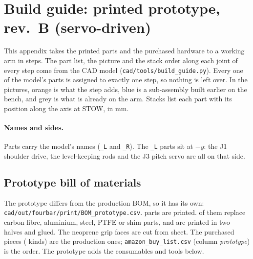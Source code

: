 \documentclass[10pt]{article}
\begin{document}
\clearpage
\appendix
\section{Build guide: printed prototype, rev.~B (servo-driven)}\label{sec:build}
This appendix takes the printed parts and the purchased hardware to a working arm in \BuildSteps{} steps. The part list,
the picture and the stack order along each joint of every step come from the CAD model
(\texttt{cad/tools/build\_guide.py}). Every one of the model's parts is assigned to exactly one step, so nothing is left
over. In the pictures, orange is what the step adds, blue is a sub-assembly built earlier on the bench, and grey is what
is already on the arm. Stacks list each part with its position along the axis at STOW, in mm.

\paragraph{Names and sides.} Parts carry the model's names (\texttt{\_L} and \texttt{\_R}). The \texttt{\_L} parts sit
at $-y$: the J1 shoulder drive, the level-keeping rods and the J3 pitch servo are all on that side.

\subsection{Prototype bill of materials}
The prototype differs from the production BOM, so it has its own: \texttt{cad/out/fourbar/print/BOM\_prototype.csv}.
\ProtoPrinted{} parts are printed. \ProtoSubst{} of them replace carbon-fibre, aluminium, steel, PTFE or shim parts,
and \ProtoHalves{} are printed in two halves and glued. The neoprene grip faces are cut from sheet. The
\ProtoBought{} purchased pieces (\ProtoBoughtLines{} kinds) are the production ones; \texttt{amazon\_buy\_list.csv}
(column \emph{prototype}) is the order. The prototype adds the consumables and tools below.
\ProtoExtras
\end{document}
